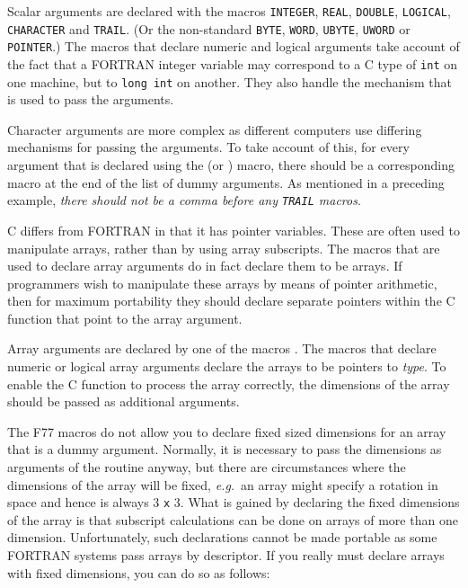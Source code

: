 \documentclass[twoside,11pt,nolof]{starlink}
\begin{document}
Scalar arguments are declared with the macros \texttt{INTEGER}, \texttt{REAL},
\texttt{DOUBLE}, \texttt{LOGICAL}, \texttt{CHARACTER} and \texttt{TRAIL}.
(Or the non-standard \texttt{BYTE}, \texttt{WORD}, \texttt{UBYTE},
\texttt{UWORD} or \texttt{POINTER}.)
The macros that declare numeric and logical arguments take account of the fact
that a FORTRAN integer variable may correspond to a C type of \texttt{int} on
one machine, but to \texttt{long int} on another.
They also handle the mechanism that is used to pass the arguments.

Character arguments are more complex as different computers use differing
mechanisms for passing the arguments. To take account of this, for every
argument that is declared using the
(or
)
macro, there should be a corresponding
macro at the end of the list of dummy arguments.
As mentioned in a preceding example, \textit{there should not be a comma before
any \texttt{TRAIL} macros}.

C differs from FORTRAN in that it has pointer variables. These are often used to
manipulate arrays, rather than by using array subscripts. The macros that are
used to declare array arguments do in fact declare them to be arrays.
If programmers wish to manipulate these arrays by means of pointer arithmetic,
then for maximum portability they should declare separate pointers within the C
function that point to the array argument.

Array arguments are declared by one of the macros
.
The macros that declare numeric or
logical array arguments declare the arrays to be pointers to \textit{type}.
To enable the C function to process the array correctly,
the dimensions of the array should be passed as additional arguments.

The F77 macros do not allow you to declare fixed sized dimensions for an array
that is a dummy argument. Normally, it is necessary to pass the dimensions as
arguments of the routine anyway, but there are circumstances where the
dimensions of the array will be fixed, \textit{e.g.}\ an array might specify a
rotation in space and hence is always 3 \texttt{x} 3.
What is gained by declaring the
fixed dimensions of the array is that subscript calculations can be done on
arrays of more than one dimension. Unfortunately, such declarations cannot be
made portable as some FORTRAN systems pass arrays by descriptor. If you really
must declare arrays with fixed dimensions, you can do so as follows:
\end{document}
